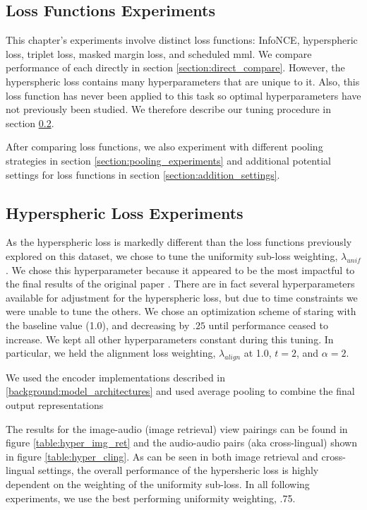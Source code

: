 \subsection{Loss Functions Experiments}
This chapter's experiments involve distinct loss functions: InfoNCE, hyperspheric loss, triplet loss, masked margin loss, and scheduled mml. 
We compare performance of each directly in section \ref{section:direct_compare}.
However, the hyperspheric loss contains many hyperparameters that are unique to it.
Also, this loss function has never been applied to this task so optimal hyperparameters have not previously been studied.
We therefore describe our tuning procedure in section \ref{section:hyperspheric_tuning}.

After comparing loss functions, we also experiment with different pooling strategies in section \ref{section:pooling_experiments} and additional potential settings for loss functions in section \ref{section:addition_settings}.




\subsection{Hyperspheric Loss Experiments}
\label{section:hyperspheric_tuning}
As the hyperspheric loss is markedly different than the loss functions previously explored on this dataset, we chose to tune the uniformity sub-loss weighting, $\lambda_{unif}$.
We chose this hyperparameter because it appeared to be the most impactful to the final results of the original paper \cite{wang2020understanding}.
There are in fact several hyperparameters available for adjustment for the hyperspheric loss, but due to time constraints we were unable to tune the others.
We chose an optimization scheme of staring with the baseline value (1.0), and decreasing by $.25$ until performance ceased to increase. 
We kept all other hyperparameters constant during this tuning. 
In particular, we held the alignment loss weighting, $\lambda_{align}$ at 1.0, $t=2$, and $\alpha=2$.

We used the encoder implementations described in \ref{background:model_architectures} and used average pooling to combine the final output representations





The results for the image-audio (image retrieval) view pairings can be found in figure \ref{table:hyper_img_ret} and the audio-audio pairs (aka cross-lingual) shown in figure \ref{table:hyper_cling}.
As can be seen in both image retrieval and cross-lingual settings, the overall performance of the hypersheric loss is highly dependent on the weighting of the uniformity sub-loss.
In all following experiments, we use the best performing uniformity weighting, .75.

